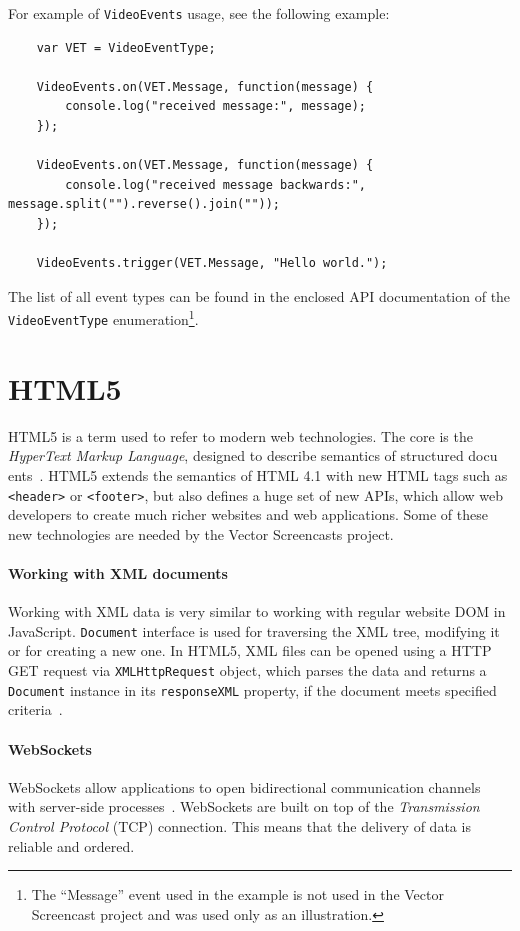 For example of \verb|VideoEvents| usage, see the following example:

\begin{lstlisting}
	var VET = VideoEventType;

	VideoEvents.on(VET.Message, function(message) {
		console.log("received message:", message);
	});

	VideoEvents.on(VET.Message, function(message) {
		console.log("received message backwards:", message.split("").reverse().join(""));
	});

	VideoEvents.trigger(VET.Message, "Hello world.");
\end{lstlisting}


The list of all event types can be found in the enclosed API documentation of the \verb|VideoEventType| enumeration\footnote{The ``Message'' event used in the example is not used in the Vector Screencast project and was used only as an illustration.}.


\section{HTML5}

HTML5 is a term used to refer to modern web technologies. The core is the \textit{HyperText Markup Language}, designed to describe semantics of structured docu ents~\cite{html5}. HTML5 extends the semantics of HTML 4.1 with new HTML tags such as \verb|<header>| or \verb|<footer>|, but also defines a huge set of new APIs, which allow web developers to create much richer websites and web applications. Some of these new technologies are needed by the Vector Screencasts project.

\paragraph{Working with XML documents}
Working with XML data is very similar to working with regular website DOM in JavaScript. \verb|Document| interface is used for traversing the XML tree, modifying it or for creating a new one. In HTML5, XML files can be opened using a HTTP GET request via \verb|XMLHttpRequest| object, which parses the data and returns a \verb|Document| instance in its \verb|responseXML| property, if the document meets specified criteria~\cite{xhr}.

\paragraph{WebSockets}
WebSockets allow applications to open bidirectional communication channels with server-side processes~\cite{websocket}. WebSockets are built on top of the \textit{Transmission Control Protocol} (TCP) connection. This means that the delivery of data is reliable and ordered.

